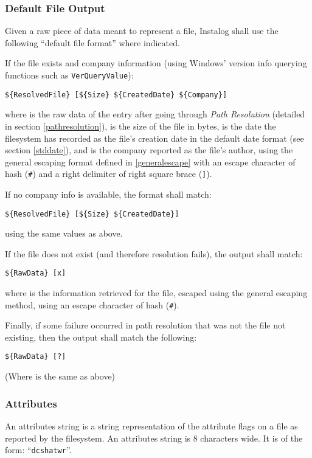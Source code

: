 \subsubsection{Default File Output} \label{stdfile}
Given a raw piece of data meant to represent a file, Instalog shall use the
following ``default file format'' where indicated.

If the file exists and company information (using Windows' version info
querying functions such as \verb|VerQueryValue|):
\begin{verbatim}
${ResolvedFile} [${Size} ${CreatedDate} ${Company}]
\end{verbatim}
where  is the raw data of the entry after going through
\textit{Path Resolution} (detailed in section \ref{pathresolution}), 
is the size of the file in bytes,  is the date the filesystem
has recorded as the file's creation date in the default date format (see
section \ref{stddate}), and  is the company reported as the
file's author, using the general escaping format defined in \ref{generalescape}
with an escape character of hash (\verb|#|) and a right delimiter of right
square brace (\verb|]|).

If no company info is available, the format shall match:
\begin{verbatim}
${ResolvedFile} [${Size} ${CreatedDate}]
\end{verbatim}
using the same values as above.

If the file does not exist (and therefore resolution fails), the output shall
match:
\begin{verbatim}
${RawData} [x]
\end{verbatim}
where  is the information retrieved for the file, escaped using the
general escaping method, using an escape character of hash (\verb|#|).

Finally, if some failure occurred in path resolution that was not the file not
existing, then the output shall match the following:
\begin{verbatim}
${RawData} [?]
\end{verbatim}
(Where  is the same as above)

\subsubsection{Attributes} \label{attributes}
An attributes string is a string representation of the attribute flags on a file
as reported by the filesystem. An attributes string is 8 characters wide. It is
of the form: ``\verb|dcshatwr|''.

